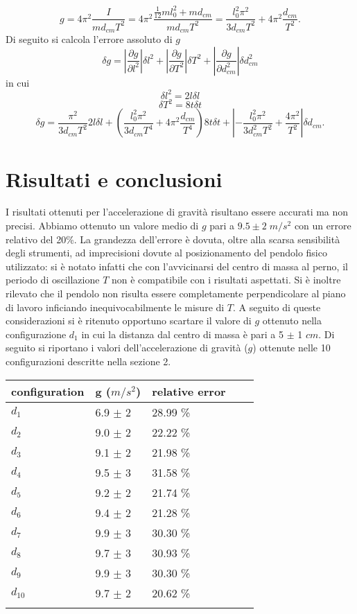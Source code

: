 \documentclass[11pt,a4paper]{article}
\begin{document}
\begin{equation}
    g=4\pi^2\frac{I}{md_{cm}T^2}=4\pi^2\frac{\frac{1}{12}ml_0^2+md_{cm}}{md_{cm}T^2}=\frac{l_0^2\pi^2}{3d_{cm}T^2}+4\pi^2\frac{d_{cm}}{T^2}.
\end{equation}
Di seguito si calcola l'errore assoluto di $g$
\begin{equation}
\delta g=\left | \frac{\partial g}{\partial l^2} \right | \delta l^2 + \left | \frac{\partial g}{\partial T^2} \right | \delta T^2 + \left | \frac{\partial g}{\partial d_{cm}^2} \right | \delta d_{cm}^2
\end{equation}
in cui 
\begin{equation}
\delta l^2=2l\delta l
\end{equation}
\begin{equation}
\delta T^2=8t\delta t
\end{equation}
\begin{equation}
\delta g=\frac{\pi^2}{3d_{cm}T^2}2l\delta l + \left (\frac{l_0^2\pi^2}{3d_{cm}T^4} + 4\pi^2\frac{d_{cm}}{T^4}\right )8t\delta t + \left |-\frac{l_0^2\pi^2}{3d_{cm}^2T^2} + \frac{4\pi^2}{T^2}\right |\delta d_{cm}.
\end{equation}

\section{Risultati e conclusioni}
I risultati ottenuti per l'accelerazione di gravità risultano essere accurati ma non precisi.
Abbiamo ottenuto un valore medio di $g$ pari a $9.5 \pm 2 \; m/s^2$ con un errore relativo del 20\%.
La grandezza dell'errore è dovuta, oltre alla scarsa sensibilità degli strumenti, ad imprecisioni dovute al posizionamento del pendolo fisico utilizzato: si è notato infatti che con l'avvicinarsi del centro di massa al perno, il periodo di oscillazione $T$ non è compatibile con i risultati aspettati. Si è inoltre rilevato che il pendolo non risulta essere completamente perpendicolare al piano di lavoro inficiando inequivocabilmente le misure di $T$. A seguito di queste considerazioni si è ritenuto opportuno scartare il valore di $g$ ottenuto nella configurazione $d_1$ in cui la distanza dal centro di massa è pari a 5 $\pm$ 1 $cm$. Di seguito si riportano i valori dell'accelerazione di gravità ($g$) ottenute nelle 10 configurazioni descritte nella sezione 2.

\begin{longtable}[]{@{}lllll@{}}
    \toprule
    configuration & g ($m/s^2$)  & relative error \tabularnewline
    \midrule
    \endhead
    $d_1$ & 6.9 $\pm$ 2 & 28.99 \% \tabularnewline
    $d_2$ & 9.0 $\pm$ 2 & 22.22 \% \tabularnewline
    $d_3$ & 9.1 $\pm$ 2 & 21.98 \% \tabularnewline
    $d_4$ & 9.5 $\pm$ 3 & 31.58 \% \tabularnewline
    $d_5$ & 9.2 $\pm$ 2 & 21.74 \% \tabularnewline
    $d_6$ & 9.4 $\pm$ 2 & 21.28 \% \tabularnewline
    $d_7$ & 9.9 $\pm$ 3 & 30.30 \% \tabularnewline
    $d_8$ & 9.7 $\pm$ 3 & 30.93 \% \tabularnewline
    $d_9$ & 9.9 $\pm$ 3 & 30.30 \% \tabularnewline
    $d_{10}$ & 9.7 $\pm$ 2 & 20.62 \%  \tabularnewline
    \bottomrule
    \label{output3}
\end{longtable}
\end{document}
